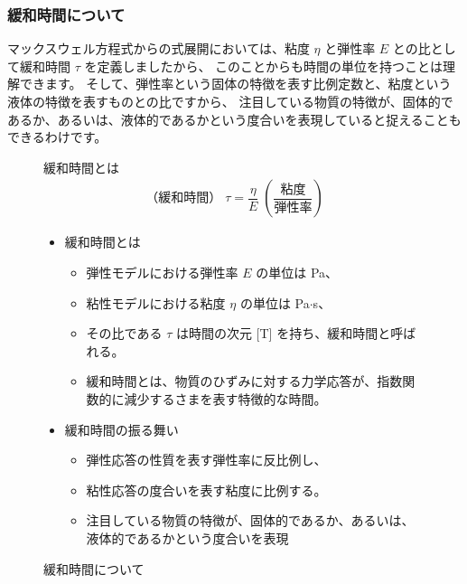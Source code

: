 \documentclass[uplatex,dvipdfmx,a4paper,11pt]{jsreport}
\begin{document}
\subsubsection{緩和時間について}
マックスウェル方程式からの式展開においては、粘度 $\eta$ と弾性率 $E$ との比として緩和時間 $\tau$ を定義しましたから、
このことからも時間の単位を持つことは理解できます。
そして、弾性率という固体の特徴を表す比例定数と、粘度という液体の特徴を表すものとの比ですから、
注目している物質の特徴が、固体的であるか、あるいは、液体的であるかという度合いを表現していると捉えることもできるわけです。

\begin{figure}[htb]
	\begin{center}
		\begin{minipage}{0.9\textwidth}
			\begin{itembox}[l]{緩和時間とは}
				\begin{align*}
					\text{（緩和時間）}\;\tau = \dfrac{\eta}{E}\; \left( \dfrac{\text{粘度}}{\text{弾性率}} \right)
				\end{align*}
				\begin{itemize}
					\item 緩和時間とは
					\begin{itemize}
						\item 弾性モデルにおける弾性率 $E$ の単位は Pa、
						\item 粘性モデルにおける粘度 $\eta$ の単位は Pa$\cdot$s、
						\item その比である $\tau$ は時間の次元 [T] を持ち、緩和時間と呼ばれる。
						\item 緩和時間とは、物質のひずみに対する力学応答が、指数関数的に減少するさまを表す特徴的な時間。
					\end{itemize}
					\item 緩和時間の振る舞い
					\begin{itemize}
						\item 弾性応答の性質を表す弾性率に反比例し、
						\item 粘性応答の度合いを表す粘度に比例する。
						\item 注目している物質の特徴が、固体的であるか、あるいは、液体的であるかという度合いを表現
					\end{itemize}
				\end{itemize}
			\end{itembox}
		\end{minipage}
		\caption{緩和時間について}
		\label{fig:tau}
	\end{center}
\end{figure}
\end{document}
